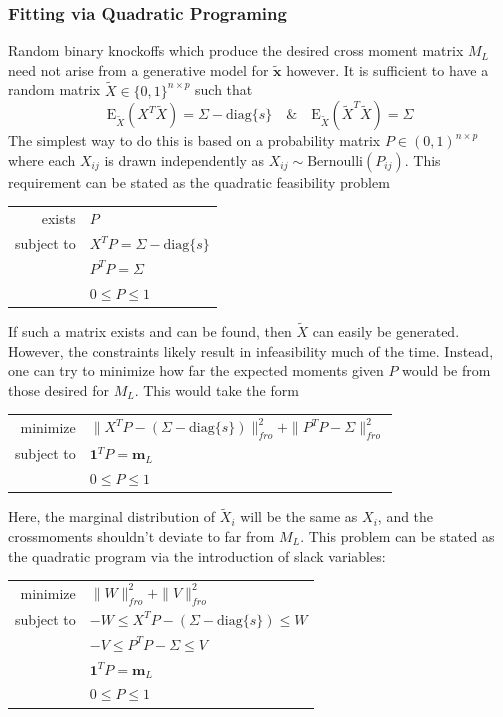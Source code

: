 \documentclass[11pt]{article}
\newcommand{\E}{\mathrm{E}}
\newcommand{\diag}[1]{\mathrm{diag}\{#1\}}
\theoremstyle{definition}
\begin{document}
\subsubsection{Fitting via Quadratic Programing}

        Random binary knockoffs which produce the desired cross moment matrix $M_L$ need not arise from a generative model for $\mathbf{\tilde x}$ however. It is sufficient to have a random matrix $\tilde X \in \{0,1\}^{n\times p}$ such that 
        \[ \E_{\tilde X}(X^T \tilde X) = \Sigma - \diag{s} \quad \& \quad \E_{\tilde X}(\tilde X^T \tilde X) = \Sigma\]
        The simplest way to do this is based on a probability matrix $P\in (0,1)^{n\times p}$ where each $X_{ij}$ is drawn independently as $X_{ij}\sim\textrm{Bernoulli}(P_{ij})$. This requirement can be stated as the quadratic feasibility problem
            \begin{center}
                \begin{tabular}{r l}
                    exists     & $P$ \\
                    subject to & $X^TP=\Sigma-\diag{s} $ \\
                               & $P^TP=\Sigma $ \\
                               & $0 \leq P \leq 1$
                \end{tabular} 
            \end{center}
        If such a matrix exists and can be found, then $\tilde X$ can easily be generated. However, the constraints likely result in infeasibility much of the time. Instead, one can try to minimize how far the expected moments given $P$ would be from those desired for $M_L$. This would take the form
            \begin{center}
                \begin{tabular}{r l}
                    minimize     & $\|X^TP-(\Sigma-\diag{s})\|_{fro}^2 + \|P^TP-\Sigma\|_{fro}^2 $\\
                    subject to   & $ \mathbf 1^T P = \mathbf m_L $ \\
                                 & $0 \leq P \leq 1$
                \end{tabular} 
            \end{center}
            Here, the marginal distribution of $\tilde X_i$ will be the same as $X_i$, and the crossmoments shouldn't deviate to far from $M_L$. This problem can be stated as the quadratic program via the introduction of slack variables:
            \begin{center}
                \begin{tabular}{r l}
                    minimize     & $\|W\|_{fro}^2 + \|V\|_{fro}^2 $ \\
                    subject to   & $ -W \leq X^TP-(\Sigma-\diag{s})\leq W $ \\
                                 & $ -V \leq P^TP-\Sigma \leq V $ \\
                                 & $ \mathbf 1^T P = \mathbf m_L $ \\
                                 & $0 \leq P \leq 1$
                \end{tabular} 
            \end{center}
\end{document}
